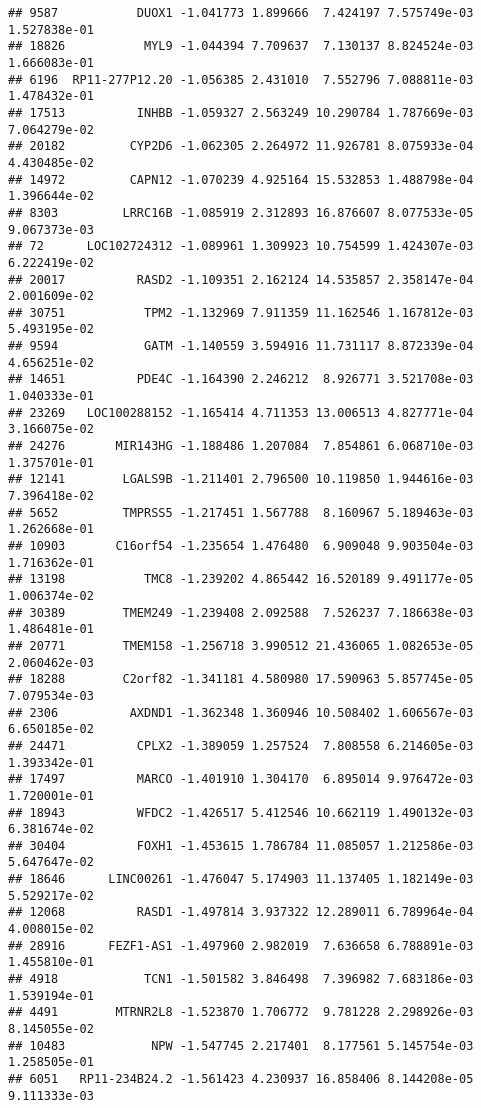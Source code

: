 \documentclass[
]{article}
\begin{document}
\begin{verbatim}
## 9587           DUOX1 -1.041773 1.899666  7.424197 7.575749e-03 1.527838e-01
## 18826           MYL9 -1.044394 7.709637  7.130137 8.824524e-03 1.666083e-01
## 6196  RP11-277P12.20 -1.056385 2.431010  7.552796 7.088811e-03 1.478432e-01
## 17513          INHBB -1.059327 2.563249 10.290784 1.787669e-03 7.064279e-02
## 20182         CYP2D6 -1.062305 2.264972 11.926781 8.075933e-04 4.430485e-02
## 14972         CAPN12 -1.070239 4.925164 15.532853 1.488798e-04 1.396644e-02
## 8303         LRRC16B -1.085919 2.312893 16.876607 8.077533e-05 9.067373e-03
## 72      LOC102724312 -1.089961 1.309923 10.754599 1.424307e-03 6.222419e-02
## 20017          RASD2 -1.109351 2.162124 14.535857 2.358147e-04 2.001609e-02
## 30751           TPM2 -1.132969 7.911359 11.162546 1.167812e-03 5.493195e-02
## 9594            GATM -1.140559 3.594916 11.731117 8.872339e-04 4.656251e-02
## 14651          PDE4C -1.164390 2.246212  8.926771 3.521708e-03 1.040333e-01
## 23269   LOC100288152 -1.165414 4.711353 13.006513 4.827771e-04 3.166075e-02
## 24276       MIR143HG -1.188486 1.207084  7.854861 6.068710e-03 1.375701e-01
## 12141        LGALS9B -1.211401 2.796500 10.119850 1.944616e-03 7.396418e-02
## 5652         TMPRSS5 -1.217451 1.567788  8.160967 5.189463e-03 1.262668e-01
## 10903       C16orf54 -1.235654 1.476480  6.909048 9.903504e-03 1.716362e-01
## 13198           TMC8 -1.239202 4.865442 16.520189 9.491177e-05 1.006374e-02
## 30389        TMEM249 -1.239408 2.092588  7.526237 7.186638e-03 1.486481e-01
## 20771        TMEM158 -1.256718 3.990512 21.436065 1.082653e-05 2.060462e-03
## 18288        C2orf82 -1.341181 4.580980 17.590963 5.857745e-05 7.079534e-03
## 2306          AXDND1 -1.362348 1.360946 10.508402 1.606567e-03 6.650185e-02
## 24471          CPLX2 -1.389059 1.257524  7.808558 6.214605e-03 1.393342e-01
## 17497          MARCO -1.401910 1.304170  6.895014 9.976472e-03 1.720001e-01
## 18943          WFDC2 -1.426517 5.412546 10.662119 1.490132e-03 6.381674e-02
## 30404          FOXH1 -1.453615 1.786784 11.085057 1.212586e-03 5.647647e-02
## 18646      LINC00261 -1.476047 5.174903 11.137405 1.182149e-03 5.529217e-02
## 12068          RASD1 -1.497814 3.937322 12.289011 6.789964e-04 4.008015e-02
## 28916      FEZF1-AS1 -1.497960 2.982019  7.636658 6.788891e-03 1.455810e-01
## 4918            TCN1 -1.501582 3.846498  7.396982 7.683186e-03 1.539194e-01
## 4491        MTRNR2L8 -1.523870 1.706772  9.781228 2.298926e-03 8.145055e-02
## 10483            NPW -1.547745 2.217401  8.177561 5.145754e-03 1.258505e-01
## 6051   RP11-234B24.2 -1.561423 4.230937 16.858406 8.144208e-05 9.111333e-03

\end{verbatim}
\end{document}
